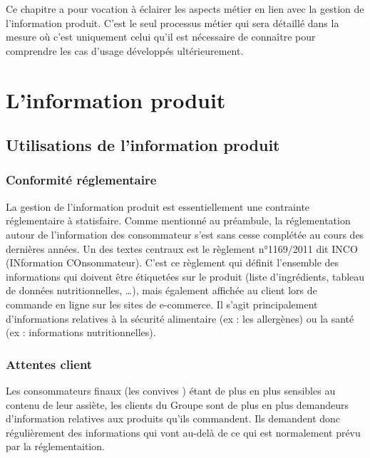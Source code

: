     \large
    Ce chapitre a pour vocation à éclairer les aspects métier en lien avec la gestion de l'information produit. 
    C'est le seul processus métier qui sera détaillé dans la mesure où c'est uniquement celui qu'il est nécessaire de connaître pour comprendre les cas d'usage développés ultérieurement.
    \normalsize

        \section{L'information produit}
        
            \subsection{Utilisations de l'information produit}
            \label{utilisation_info_produit}

                \subsubsection{Conformité réglementaire}
                La gestion de l'information produit est essentiellement une contrainte réglementaire à statisfaire.
                Comme mentionné au préambule, la réglementation autour de l'information des consommateur s'est sans cesse complétée au cours des dernières années.
                Un des textes centraux est le règlement n°1169/2011 dit INCO (INformation COnsommateur)\cite{incotext}\cite{incoexpl}.
                C'est ce règlement qui définit l'ensemble des informations qui doivent être étiquetées sur le produit (liste d'ingrédients, tableau de données nutritionnelles, \dots), mais également affichée au client lors de commande en ligne sur les sites de e-commerce.
                Il s'agit principalement d'informations relatives à la sécurité alimentaire (ex : les allergènes) ou la santé (ex : informations nutritionnelles).

                \subsubsection{Attentes client}

                Les consommateurs finaux (les \og convives \fg) étant de plus en plus sensibles au contenu de leur assiète, les clients du Groupe sont de plus en plus demandeurs d'information relatives aux produits qu'ils commandent.
                Ils demandent donc régulièrement des informations qui vont au-delà de ce qui est normalement prévu par la réglementaition.


